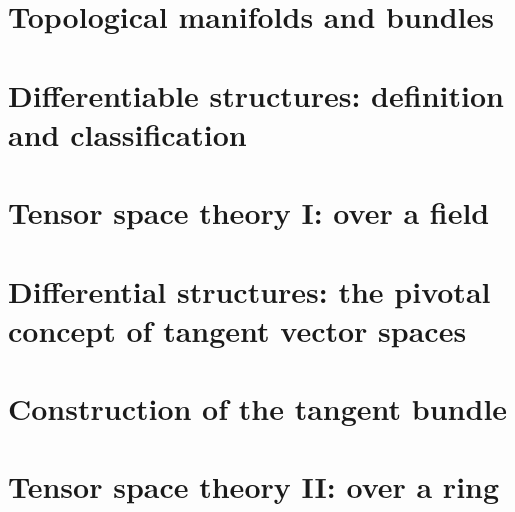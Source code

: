 \documentclass[a4paper,11pt]{article}
\theoremstyle{definition} %
\theoremstyle{plain} %
\theoremstyle{remark} %
\begin{document}
\section{Topological manifolds and bundles}

\newpage

\section{Differentiable structures: definition and classification}

\newpage

\section{Tensor space theory I: over a field}

\newpage

 \section{Differential structures: the pivotal concept of tangent vector spaces}
 
 \newpage

\section{Construction of the tangent bundle}

\newpage


\section{Tensor space theory II: over a ring}

\newpage

% 




\end{document}
